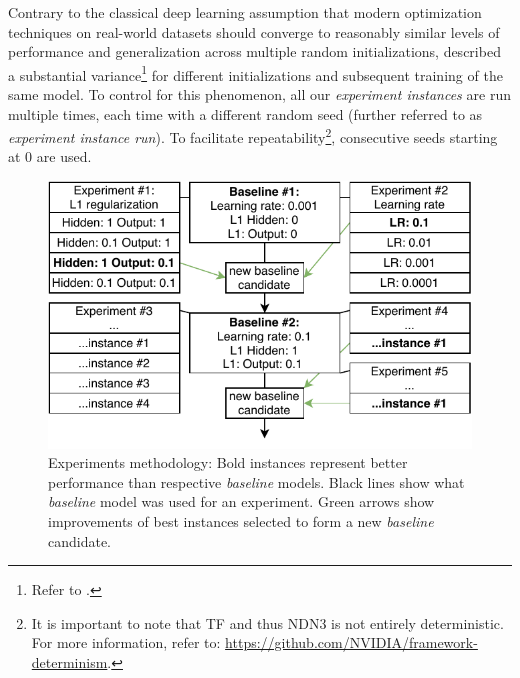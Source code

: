 Contrary to the classical deep learning assumption \citep{2017arXiv170610239W} that modern optimization techniques on real-world datasets should converge to reasonably similar levels of performance and generalization across multiple random initializations, \citeauthor{antolik} described a substantial variance\footnote{Refer to .} for different initializations and subsequent training of the same model. To control for this phenomenon, all our \textit{experiment instances} are run multiple times, each time with a different random seed (further referred to as \textit{experiment instance run}). To facilitate repeatability\footnote{It is important to note that TF and thus NDN3 is not entirely deterministic. For more information, refer to: \href{https://github.com/NVIDIA/framework-determinism}{https://github.com/NVIDIA/framework-determinism}.}, consecutive seeds starting at 0 are used.

\begin{figure}[ht]
    \centering
    \includegraphics[]{../figures/04_explor_1}
    \caption[Experiments methodology]{Experiments methodology: Bold instances represent better performance than respective \textit{baseline} models. Black lines show what \textit{baseline} model was used for an experiment. Green arrows show improvements of best instances selected to form a new \textit{baseline} candidate.}
    \label{fig:4.1}
\end{figure}

